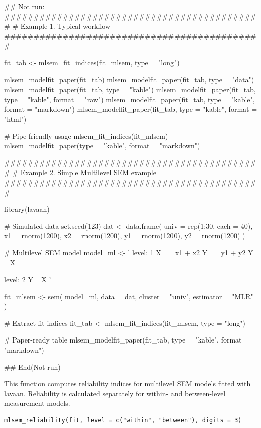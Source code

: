 \documentclass[a4paper]{book}
\begin{document}
\begin{Examples}
\begin{ExampleCode}
## Not run: 
############################################
# Example 1. Typical workflow
############################################

fit_tab <- mlsem_fit_indices(fit_mlsem, type = "long")

mlsem_modelfit_paper(fit_tab)
mlsem_modelfit_paper(fit_tab, type = "data")
mlsem_modelfit_paper(fit_tab, type = "kable")
mlsem_modelfit_paper(fit_tab, type = "kable", format = "raw")
mlsem_modelfit_paper(fit_tab, type = "kable", format = "markdown")
mlsem_modelfit_paper(fit_tab, type = "kable", format = "html")

# Pipe-friendly usage
mlsem_fit_indices(fit_mlsem) %
  mlsem_modelfit_paper(type = "kable", format = "markdown")


############################################
# Example 2. Simple Multilevel SEM example
############################################

library(lavaan)

# Simulated data
set.seed(123)
dat <- data.frame(
  univ = rep(1:30, each = 40),
  x1 = rnorm(1200),
  x2 = rnorm(1200),
  y1 = rnorm(1200),
  y2 = rnorm(1200)
)

# Multilevel SEM model
model_ml <- '
  level: 1
    X =~ x1 + x2
    Y =~ y1 + y2
    Y ~ X

  level: 2
    Y ~ X
'

fit_mlsem <- sem(
  model_ml,
  data    = dat,
  cluster = "univ",
  estimator = "MLR"
)

# Extract fit indices
fit_tab <- mlsem_fit_indices(fit_mlsem, type = "long")

# Paper-ready table
mlsem_modelfit_paper(fit_tab, type = "kable", format = "markdown")

## End(Not run)
\end{ExampleCode}
\end{Examples}
%
\begin{Description}
This function computes reliability indices for multilevel SEM models
fitted with lavaan. Reliability is calculated separately for within-
and between-level measurement models.
\end{Description}
%
\begin{Usage}
\begin{verbatim}
mlsem_reliability(fit, level = c("within", "between"), digits = 3)
\end{verbatim}
\end{Usage}
\end{document}
